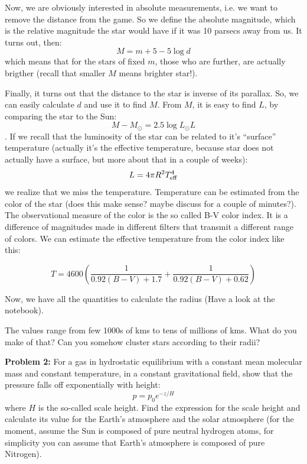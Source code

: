 \documentclass[12pt]{article}
\begin{document}
Now, we are obviously interested in absolute measurements, i.e. we want to remove the distance from the game. So we define the absolute magnitude, which is the relative magnitude the star would have if it was 10 parsecs away from us. It turns out, then: 
\begin{equation}
M = m +5 - 5 \log d 
\end{equation}
which means that for the stars of fixed $m$, those who are further, are actually brigther (recall that smaller $M$ means brighter star!). 

Finally, it turns out that the distance to the star is inverse of its parallax. So, we can easily calculate $d$ and use it to find $M$. From $M$, it is easy to find $L$, by comparing the star to the Sun: 
\begin{equation}
M - M_{\odot} = 2.5 \log {L_{\odot}}{L}
\end{equation}.
If we recall that the luminosity of the star can be related to it's ``surface'' temperature (actually it's the effective temperature, because star does not actually have a surface, but more about that in a couple of weeks):
\begin{equation}
L = 4\pi R^2 T_{\rm eff}^4
\end{equation}
we realize that we miss the temperature. Temperature can be estimated from the color of the star (does this make sense? maybe discuss for a couple of minutes?). The observational measure of the color is the so called B-V color index. It is a difference of magnitudes made in different filters that transmit a different range of colors. We can estimate the effective temperature from the color index like this: 

\begin{equation}
T = 4600 \left ( \frac{1}{0.92 (B-V) + 1.7} + \frac{1}{0.92 (B-V) + 0.62} \right )
\end{equation}

Now, we have all the quantities to calculate the radius (Have a look at the notebook).

The values range from few 1000s of kms to tens of millions of kms. What do you make of that? Can you somehow cluster stars according to their radii?

\pagebreak

{\bf Problem 2:} For a gas in hydrostatic equilibrium with a constant mean molecular mass and constant temperature, in a constant gravitational field, show that the pressure falls off exponentially with height: 
\begin{equation}
p = p_0 e^{-z/H}
\end{equation}
where $H$ is the so-called scale height. Find the expression for the scale height and calculate its value for the Earth's atmosphere and the solar atmosphere (for the moment, assume the Sun is composed of pure neutral hydrogen atoms, for simplicity you can assume that Earth's atmosphere is composed of pure Nitrogen).
\end{document}
